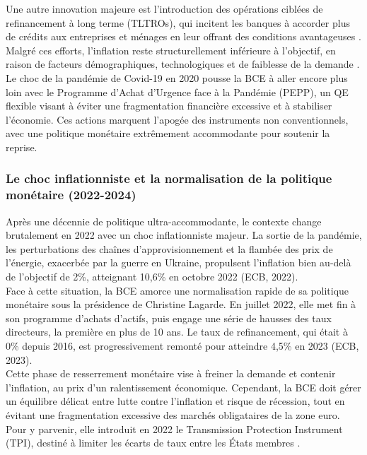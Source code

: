 Une autre innovation majeure est l’introduction des opérations ciblées de refinancement à long terme (TLTROs), qui incitent les banques à accorder plus de crédits aux entreprises et ménages en leur offrant des conditions avantageuses \citep{altavilla2019}. Malgré ces efforts, l’inflation reste structurellement inférieure à l’objectif, en raison de facteurs démographiques, technologiques et de faiblesse de la demande \citep{blanchard2019}.\\

Le choc de la pandémie de Covid-19 en 2020 pousse la BCE à aller encore plus loin avec le Programme d’Achat d’Urgence face à la Pandémie (PEPP), un QE flexible visant à éviter une fragmentation financière excessive et à stabiliser l’économie. Ces actions marquent l’apogée des instruments non conventionnels, avec une politique monétaire extrêmement accommodante pour soutenir la reprise.

\subsubsection{Le choc inflationniste et la normalisation de la politique monétaire (2022-2024)}

Après une décennie de politique ultra-accommodante, le contexte change brutalement en 2022 avec un choc inflationniste majeur. La sortie de la pandémie, les perturbations des chaînes d’approvisionnement et la flambée des prix de l’énergie, exacerbée par la guerre en Ukraine, propulsent l’inflation bien au-delà de l’objectif de 2\%, atteignant 10,6\% en octobre 2022 (ECB, 2022).\\

Face à cette situation, la BCE amorce une normalisation rapide de sa politique monétaire sous la présidence de Christine Lagarde. En juillet 2022, elle met fin à son programme d’achats d’actifs, puis engage une série de hausses des taux directeurs, la première en plus de 10 ans. Le taux de refinancement, qui était à 0\% depuis 2016, est progressivement remonté pour atteindre 4,5\% en 2023 (ECB, 2023).\\

Cette phase de resserrement monétaire vise à freiner la demande et contenir l’inflation, au prix d’un ralentissement économique. Cependant, la BCE doit gérer un équilibre délicat entre lutte contre l’inflation et risque de récession, tout en évitant une fragmentation excessive des marchés obligataires de la zone euro. Pour y parvenir, elle introduit en 2022 le Transmission Protection Instrument (TPI), destiné à limiter les écarts de taux entre les États membres \citep{lane2023}.\\

